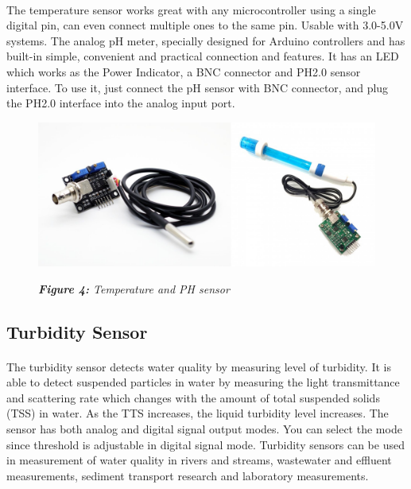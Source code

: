 \documentclass[12pt]{article}
\begin{document}
\paragraph*{}
The temperature sensor works great with any microcontroller using a single digital pin, can even connect multiple ones to the same pin. Usable with 3.0-5.0V systems. The analog pH meter, specially designed for Arduino controllers and has built-in simple, convenient and practical connection and features. It has an LED which works as the Power Indicator, a BNC connector and PH2.0 sensor interface. To use it, just connect the pH sensor with BNC connector, and plug the PH2.0 interface into the analog input port.
\begin{figure}
\includegraphics[scale=0.4]{tem&ph.png}   %
\begin{center}
\textit{\textbf{Figure 4:}  Temperature and PH sensor } %
\end{center}
\end{figure}
\newpage
\subsection*{Turbidity Sensor}
\paragraph*{}
 The turbidity sensor detects water quality by measuring level of turbidity. It is able to detect suspended particles in water by measuring the light transmittance and scattering rate which changes with the amount of total suspended solids (TSS) in water. As the TTS increases, the liquid turbidity level increases. The sensor has both analog and digital signal output modes. You can select the mode since threshold is adjustable in digital signal mode. Turbidity sensors can be used in measurement of water quality in rivers and streams, wastewater and effluent measurements, sediment transport research and laboratory measurements.
\end{document}
